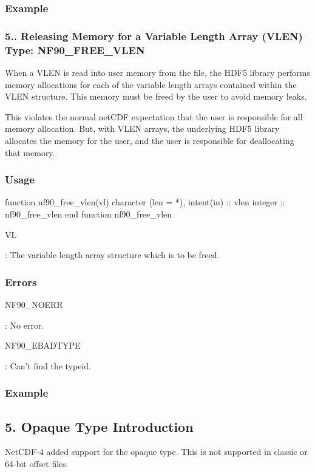 \subsubsection*{Example}\hypertarget{f90-user-defined-data-types_f90-releasing-memory-for-a-variable-length-array-vlen-type-nf90_free_vlen}{}\subsubsection{5.. Releasing Memory for a Variable Length Array (\+V\+L\+E\+N) Type\+: N\+F90\+\_\+\+F\+R\+E\+E\+\_\+\+V\+L\+EN}\label{f90-user-defined-data-types_f90-releasing-memory-for-a-variable-length-array-vlen-type-nf90_free_vlen}
When a V\+L\+EN is read into user memory from the file, the H\+D\+F5 library performs memory allocations for each of the variable length arrays contained within the V\+L\+EN structure. This memory must be freed by the user to avoid memory leaks.

This violates the normal net\+C\+DF expectation that the user is responsible for all memory allocation. But, with V\+L\+EN arrays, the underlying H\+D\+F5 library allocates the memory for the user, and the user is responsible for deallocating that memory.

\subsubsection*{Usage}


\begin{DoxyCode}
\textcolor{keyword}{function }nf90\_free\_vlen(vl)
  \textcolor{keywordtype}{character (len = *)}, \textcolor{keywordtype}{intent(in)} :: vlen
  \textcolor{keywordtype}{integer} :: nf90\_free\_vlen
\textcolor{keyword}{end function }nf90\_free\_vlen
\end{DoxyCode}


{\ttfamily VL}

\+: The variable length array structure which is to be freed.

\subsubsection*{Errors}

{\ttfamily N\+F90\+\_\+\+N\+O\+E\+RR}

\+: No error.

{\ttfamily N\+F90\+\_\+\+E\+B\+A\+D\+T\+Y\+PE}

\+: Can’t find the typeid.

\subsubsection*{Example}\hypertarget{f90-user-defined-data-types_f90-opaque-type-introduction}{}\subsection{5. Opaque Type Introduction }\label{f90-user-defined-data-types_f90-opaque-type-introduction}
Net\+C\+D\+F-\/4 added support for the opaque type. This is not supported in classic or 64-\/bit offset files.

